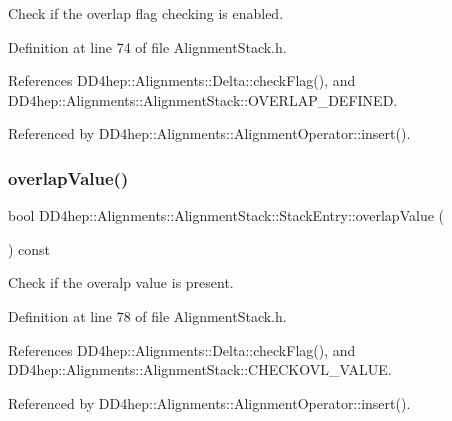 Check if the overlap flag checking is enabled. 



Definition at line 74 of file Alignment\+Stack.\+h.



References D\+D4hep\+::\+Alignments\+::\+Delta\+::check\+Flag(), and D\+D4hep\+::\+Alignments\+::\+Alignment\+Stack\+::\+O\+V\+E\+R\+L\+A\+P\+\_\+\+D\+E\+F\+I\+N\+ED.



Referenced by D\+D4hep\+::\+Alignments\+::\+Alignment\+Operator\+::insert().

\hypertarget{struct_d_d4hep_1_1_alignments_1_1_alignment_stack_1_1_stack_entry_a6e1b32b20c7cc470786a945e19a9fef3}{}\label{struct_d_d4hep_1_1_alignments_1_1_alignment_stack_1_1_stack_entry_a6e1b32b20c7cc470786a945e19a9fef3} 
\subsubsection{\texorpdfstring{overlap\+Value()}{overlapValue()}}
{\footnotesize\ttfamily bool D\+D4hep\+::\+Alignments\+::\+Alignment\+Stack\+::\+Stack\+Entry\+::overlap\+Value (\begin{DoxyParamCaption}{ }\end{DoxyParamCaption}) const\hspace{0.3cm}{\ttfamily [inline]}}



Check if the overalp value is present. 



Definition at line 78 of file Alignment\+Stack.\+h.



References D\+D4hep\+::\+Alignments\+::\+Delta\+::check\+Flag(), and D\+D4hep\+::\+Alignments\+::\+Alignment\+Stack\+::\+C\+H\+E\+C\+K\+O\+V\+L\+\_\+\+V\+A\+L\+UE.



Referenced by D\+D4hep\+::\+Alignments\+::\+Alignment\+Operator\+::insert().

\hypertarget{struct_d_d4hep_1_1_alignments_1_1_alignment_stack_1_1_stack_entry_acafcd9394e676b875de7b9bc9d58790f}{}\label{struct_d_d4hep_1_1_alignments_1_1_alignment_stack_1_1_stack_entry_acafcd9394e676b875de7b9bc9d58790f} 
